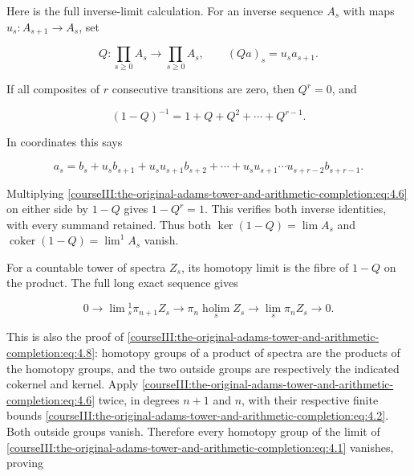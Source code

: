Here is the full inverse-limit calculation. For an inverse sequence \(A_s\) with maps \(u_s:A_{s+1}\to A_s\), set

\begin{equation}
Q:\prod_{s\geq0}A_s\longrightarrow\prod_{s\geq0}A_s,
\qquad (Qa)_s=u_sa_{s+1}.
\label{courseIII:the-original-adams-tower-and-arithmetic-completion:eq:4.5}
\end{equation}

If all composites of \(r\) consecutive transitions are zero, then \(Q^r=0\), and

\begin{equation}
(1-Q)^{-1}=1+Q+Q^2+\cdots+Q^{r-1}.
\label{courseIII:the-original-adams-tower-and-arithmetic-completion:eq:4.6}
\end{equation}

In coordinates this says

\begin{equation}
a_s=b_s+u_sb_{s+1}+u_su_{s+1}b_{s+2}
+\cdots+u_su_{s+1}\cdots u_{s+r-2}b_{s+r-1}.
\label{courseIII:the-original-adams-tower-and-arithmetic-completion:eq:4.7}
\end{equation}

Multiplying \eqref{courseIII:the-original-adams-tower-and-arithmetic-completion:eq:4.6} on either side by \(1-Q\) gives \(1-Q^r=1\). This verifies both inverse identities, with every summand retained. Thus both \(\ker(1-Q)=\lim A_s\) and \(\operatorname{coker}(1-Q)=\lim^1 A_s\) vanish.

For a countable tower of spectra \(Z_s\), its homotopy limit is the fibre of \(1-Q\) on the product. The full long exact sequence gives

\begin{equation}
0\longrightarrow\lim{}^1_s\pi_{n+1}Z_s
\longrightarrow\pi_n\operatorname*{holim}_s Z_s
\longrightarrow\lim_s\pi_nZ_s\longrightarrow0.
\label{courseIII:the-original-adams-tower-and-arithmetic-completion:eq:4.8}
\end{equation}

This is also the proof of \eqref{courseIII:the-original-adams-tower-and-arithmetic-completion:eq:4.8}: homotopy groups of a product of spectra are the products of the homotopy groups, and the two outside groups are respectively the indicated cokernel and kernel. Apply \eqref{courseIII:the-original-adams-tower-and-arithmetic-completion:eq:4.6} twice, in degrees \(n+1\) and \(n\), with their respective finite bounds \eqref{courseIII:the-original-adams-tower-and-arithmetic-completion:eq:4.2}. Both outside groups vanish. Therefore every homotopy group of the limit of \eqref{courseIII:the-original-adams-tower-and-arithmetic-completion:eq:4.1} vanishes, proving

